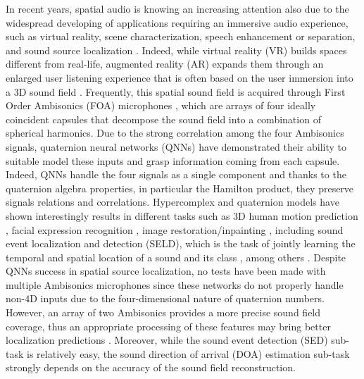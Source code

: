 \documentclass[3p, preprint, twocolumn]{elsarticle}
\begin{document}
In recent years, spatial audio is knowing an increasing attention also due to the widespread developing of applications requiring an immersive audio experience, such as virtual reality, scene characterization, speech enhancement or separation, and sound source localization \cite{Michelsanti2021TASLP, Manamperi2022TASLP, Comanducci2020TASLP, Cisneros2019VR}. Indeed, while virtual reality (VR) builds spaces different from real-life, augmented reality (AR) expands them through an enlarged user listening experience that is often based on the user immersion into a 3D sound field \cite{Kailas2021Springer, Majumder_2021_ICCV, Sundareswaran2003AR3D}. Frequently, this spatial sound field is acquired through First Order Ambisonics (FOA) 
microphones \cite{Saladnet2021, Mroz20216dof, Gotz2021Amb, guizzo2021l3das21, Guizzo2022L3DAS22CL}, which are arrays of four ideally coincident capsules that decompose the sound field into a combination of spherical harmonics. Due to the strong correlation among the four Ambisonics signals, quaternion neural networks (QNNs) have demonstrated their ability to suitable model these inputs and grasp information coming from each capsule. Indeed, QNNs handle the four signals as a single component and thanks to the quaternion algebra properties, in particular the Hamilton product, they preserve signals relations and correlations. Hypercomplex and quaternion models have shown interestingly results in different tasks such as 3D human motion prediction \cite{CAO2022141}, facial expression recognition \cite{Zhou2022TETCI}, image restoration/inpainting \cite{Huang2021QRestore, Jia2022TIP}, including sound event localization and detection (SELD), which is the task of jointly learning the temporal and spatial location of a sound and its class \cite{SELD, ComminielloICASSP2019b, Brignone2022ISCAS, QSSL, SalvatiIJCNN2020}, among others \cite{math10071083, NavarroMorenoR21, Chen2021Qfact, Guo2021QHyper, Zhang2022TNNLS}. Despite QNNs success in spatial source localization, no tests have been made with multiple Ambisonics microphones since these networks do not properly handle non-$4$D inputs due to the four-dimensional nature of quaternion numbers. However, an array of two Ambisonics provides a more precise sound field coverage, thus an appropriate processing of these features may bring better localization predictions \cite{Poschadel2021EUSIPCO}. Moreover, while the sound event detection (SED) sub-task is relatively easy, the sound direction of arrival (DOA) estimation sub-task strongly depends on the accuracy of the sound field reconstruction.
\end{document}
